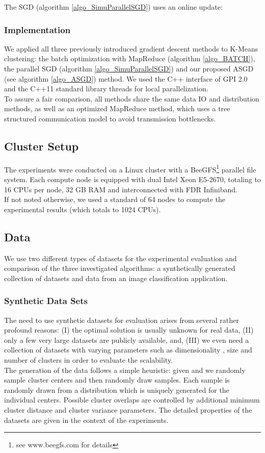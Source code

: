 \documentclass{acm_proc_article-sp}
\begin{document}
The SGD (algorithm \ref{algo_SimuParallelSGD}) uses an online update:


\subsubsection*{Implementation}
We applied all three previously introduced gradient descent methods to 
K-Means clustering: the batch optimization with 
MapReduce
\cite{chu2007map} (algorithm \ref{algo_BATCH}), 
the parallel SGD \cite{SGDsmola} (algorithm \ref{algo_SimuParallelSGD})
 and our proposed ASGD (see algorithm \ref{algo_ASGD}) 
method. We used the C++ interface of GPI 2.0 \cite{grunewald2013gaspi} 
and the C++11
standard library threads for local parallelization.\\
To assure a fair comparison, all methods share the same data IO and distribution 
methods, as well as an optimized MapReduce method, which uses a tree 
structured communication model to avoid transmission bottlenecks.   

\subsection{Cluster Setup}
The experiments were conducted on a Linux cluster with a BeeGFS\footnote{see www.beegfs.com for details}
parallel file system.  
Each compute node is equipped
 with dual Intel Xeon E5-2670, totaling to 16 CPUs per node, 32 GB RAM and 
interconnected with FDR Infiniband.\\
If not noted otherwise, we used a standard of 64 nodes to compute the 
experimental results (which totals to 1024 CPUs). 

\subsection{Data\label{sec_data}}
We use two different types of datasets for the experimental evaluation
and comparison of the three investigated algorithms: a synthetically generated
collection of datasets and data from an image classification application.
\subsubsection*{Synthetic Data Sets}
The need to use synthetic datasets for evaluation arises from several rather 
profound reasons: (I) the optimal solution is usually unknown for real data,
(II) only a few very large datasets are publicly available, and, (III) we even 
need a collection of datasets with varying parameters such as dimensionality ,
size  and number of clusters  in order to evaluate the scalability.\\
The generation of the data follows a simple heuristic: given  and  we
randomly sample  cluster centers and then randomly draw  samples. Each
sample is randomly drawn from a distribution which is uniquely generated for 
the individual centers. Possible cluster overlaps are controlled by additional
minimum cluster distance and cluster variance parameters. The detailed properties 
of the datasets are given in the context of the experiments.     
\end{document}
